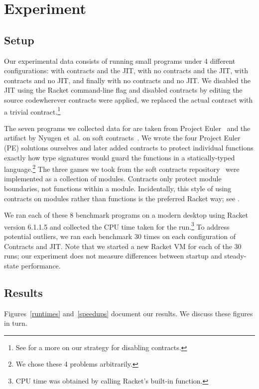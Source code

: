 \section{Experiment}
\label{experiment}
\subsection{Setup}
Our experimental data consists of running small programs under 4 different configurations: with contracts and the JIT, with no contracts and the JIT, with contracts and no JIT, and finally with no contracts and no JIT.
We disabled the JIT using the Racket command-line flag  and disabled contracts by editing the  source code\textemdash wherever contracts were applied, we replaced the actual contract with a trivial  contract.\footnote{See  for a more on our strategy for disabling contracts.}

The seven programs we collected data for are taken from Project Euler~\cite{project-euler} and the artifact by Nyugen et~al. on soft contracts~\cite{soft-contracts}.
We wrote the four Project Euler (PE) solutions ourselves and later added contracts to protect individual functions exactly how type signatures would guard the functions in a statically-typed language.\footnote{We chose these 4 problems arbitrarily.}
The three games we took from the soft contracts repository~\cite{soft-contracts-repo} were implemented as a collection of modules.
Contracts only protect module boundaries, not functions within a module.
Incidentally, this style of using contracts on modules rather than functions is the preferred Racket way; see .

We ran each of these 8 benchmark programs on a modern desktop using Racket version 6.1.1.5 and collected the CPU time taken for the run.\footnote{CPU time was obtained by calling Racket's built-in  function.}
To address potential outliers, we ran each benchmark 30 times on each configuration of Contracts and JIT.
Note that we started a new Racket VM for each of the 30 runs; our experiment does not measure differences between startup and steady-state performance.

\subsection{Results}
Figures~\ref{runtimes} and~\ref{speedups} document our results.
We discuss these figures in turn.

